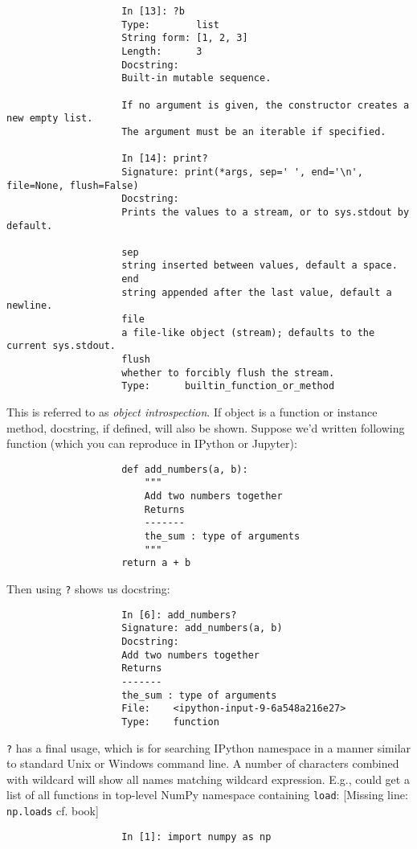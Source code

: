 \documentclass{article}
\begin{document}
\begin{enumerate}
\begin{itemize}
\begin{itemize}
\begin{itemize}
\begin{verbatim}
					In [13]: ?b
					Type:        list
					String form: [1, 2, 3]
					Length:      3
					Docstring:  
					Built-in mutable sequence.
					
					If no argument is given, the constructor creates a new empty list.
					The argument must be an iterable if specified.
					
					In [14]: print?
					Signature: print(*args, sep=' ', end='\n', file=None, flush=False)
					Docstring:
					Prints the values to a stream, or to sys.stdout by default.
					
					sep
					string inserted between values, default a space.
					end
					string appended after the last value, default a newline.
					file
					a file-like object (stream); defaults to the current sys.stdout.
					flush
					whether to forcibly flush the stream.
					Type:      builtin_function_or_method
				\end{verbatim}
				This is referred to as {\it object introspection}. If object is a function or instance method, docstring, if defined, will also be shown. Suppose we'd written following function (which you can reproduce in IPython or Jupyter):
				\begin{verbatim}
					def add_numbers(a, b):
					    """
					    Add two numbers together
					    Returns
					    -------
					    the_sum : type of arguments
					    """
					return a + b
				\end{verbatim}
				Then using {\tt?} shows us docstring:
				\begin{verbatim}
					In [6]: add_numbers?
					Signature: add_numbers(a, b)
					Docstring:
					Add two numbers together
					Returns
					-------
					the_sum : type of arguments
					File:    <ipython-input-9-6a548a216e27>
					Type:    function
				\end{verbatim}
				{\tt?} has a final usage, which is for searching IPython namespace in a manner similar to standard Unix or Windows command line. A number of characters combined with wildcard {\tt*} will show all names matching wildcard expression. E.g., could get a list of all functions in top-level NumPy namespace containing {\tt load}: [Missing line: {\tt np.loads} cf. book]
				\begin{verbatim}
					In [1]: import numpy as np
					

\end{verbatim}
\end{itemize}
\end{itemize}
\end{itemize}
\end{enumerate}
\end{document}
